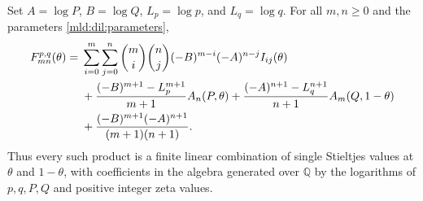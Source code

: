 \begin{theorem}
\label{mld:dil:full-stieltjes}
Set $A=\log P$, $B=\log Q$, $L_p=\log p$, and $L_q=\log q$.
For all $m,n\ge0$ and the parameters \eqref{mld:dil:parameters},
\begin{align}
 F_{mn}^{p,q}(\theta)={}&
 \sum_{i=0}^m\sum_{j=0}^n\binom mi\binom nj
             (-B)^{m-i}(-A)^{n-j}I_{ij}(\theta)\notag\\
 &+\frac{(-B)^{m+1}-L_p^{m+1}}{m+1}A_n(P,\theta)
  +\frac{(-A)^{n+1}-L_q^{n+1}}{n+1}A_m(Q,1-\theta)\notag\\
 &+\frac{(-B)^{m+1}(-A)^{n+1}}{(m+1)(n+1)}.
 \label{mld:dil:full-formula}
\end{align}
Thus every such product is a finite linear combination of single
Stieltjes values at $\theta$ and $1-\theta$, with coefficients in the
algebra generated over $\mathbb Q$ by the logarithms of $p,q,P,Q$ and
positive integer zeta values.
\end{theorem}

